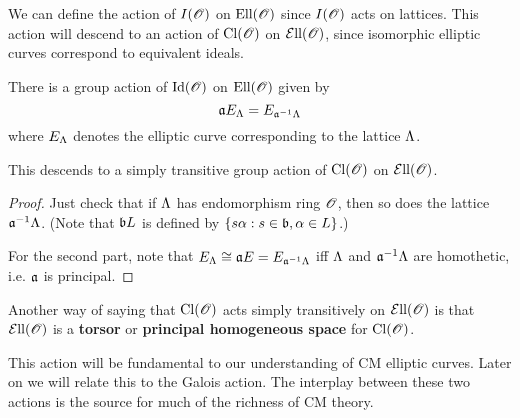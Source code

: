 We can define the action of $I(\mathscr{O})$ on $\text{Ell}(\mathscr{O})$ since $I(\mathscr{O})$ acts on lattices. This action will descend to an action of $\operatorname{Cl}(\mathscr{O})$ on $\mathcal{E}{\rm{ll}}(\mathscr{O})$, since isomorphic elliptic curves correspond to equivalent ideals.
\begin{thm}
There is a group action of $\operatorname{Id}(\mathscr{O})$ on $\text{Ell}(\mathscr{O})$ given by
\[
\mathfrak{a} E_{\Lambda}=E_{\mathfrak{a}^{-1}\Lambda}
\]
where $E_{\Lambda}$ denotes the elliptic curve corresponding to the lattice $\Lambda$.

This descends to a simply transitive group action of $\operatorname{Cl}(\mathscr{O})$ on $\mathcal{E}{\rm{ll}}(\mathscr{O})$.
\end{thm}
\begin{proof}
Just check that if $\Lambda$ has endomorphism ring $\mathscr{O}$, then so does the lattice $\mathfrak{a}^{-1}\Lambda$. (Note that $\mathfrak{b} L$ is defined by $\left\{{s\alpha}:{s\in \mathfrak{b}, \alpha\in L}\right\}$.)

For the second part, note that $E_{\Lambda}\cong \mathfrak{a} E=E_{\mathfrak{a}^{-1}\Lambda}$ iff $\Lambda$ and $\mathfrak{a}^{-1}\Lambda$ are homothetic, i.e. $\mathfrak{a}$ is principal.
\end{proof}
\begin{rem}
Another way of saying that $\operatorname{Cl}(\mathscr{O})$ acts simply transitively on $\mathcal{E}{\rm{ll}}(\mathscr{O})$ is that $\mathcal{E}{\rm{ll}}(\mathscr{O})$ is a \textbf{torsor} or \textbf{principal homogeneous space} for $\operatorname{Cl}(\mathscr{O})$.
\end{rem}
This action will be fundamental to our understanding of CM elliptic curves. Later on we will relate this to the Galois action. The interplay between these two actions is the source for much of the richness of CM theory.

